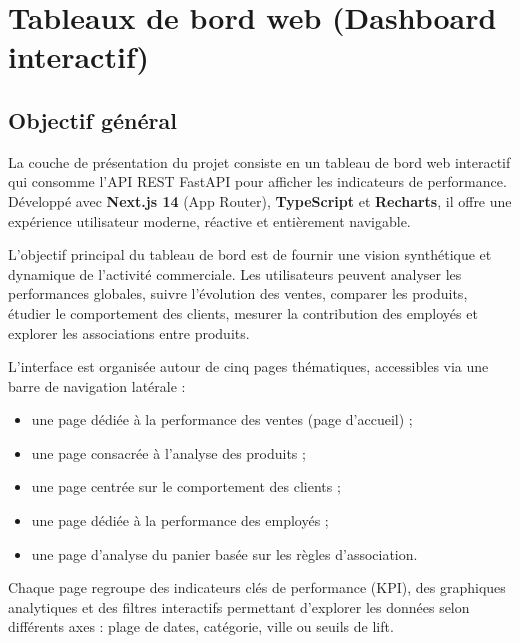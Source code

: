 \documentclass[12pt,a4paper,twoside]{report}
\begin{document}
\chapter{Tableaux de bord web (Dashboard interactif)}

\section{Objectif général}

La couche de présentation du projet consiste en un tableau de bord web interactif qui consomme l'API REST FastAPI pour afficher les indicateurs de performance. Développé avec \textbf{Next.js 14} (App Router), \textbf{TypeScript} et \textbf{Recharts}, il offre une expérience utilisateur moderne, réactive et entièrement navigable.

L'objectif principal du tableau de bord est de fournir une vision synthétique et dynamique de l'activité commerciale. Les utilisateurs peuvent analyser les performances globales, suivre l'évolution des ventes, comparer les produits, étudier le comportement des clients, mesurer la contribution des employés et explorer les associations entre produits.

L'interface est organisée autour de cinq pages thématiques, accessibles via une barre de navigation latérale :

\begin{itemize}
  \item une page dédiée à la performance des ventes (page d'accueil) ;
  \item une page consacrée à l'analyse des produits ;
  \item une page centrée sur le comportement des clients ;
  \item une page dédiée à la performance des employés ;
  \item une page d'analyse du panier basée sur les règles d'association.
\end{itemize}

Chaque page regroupe des indicateurs clés de performance (KPI), des graphiques analytiques et des filtres interactifs permettant d'explorer les données selon différents axes : plage de dates, catégorie, ville ou seuils de lift.
\end{document}
